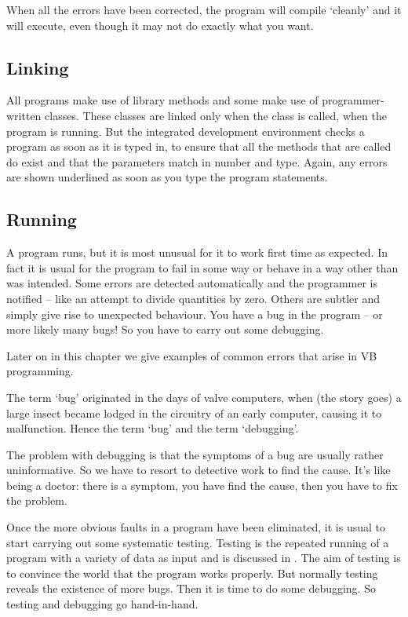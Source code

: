 			When all the errors have been corrected, the program will compile ‘cleanly’ and it will execute, even though it may not do exactly what you want.


		\subsection*{Linking}
			All programs make use of library methods and some make use of programmer-written classes. These classes are linked only when the class is called, when the program is running. But the integrated development environment checks a program as soon as it is typed in, to ensure that all the methods that are called do exist and that the parameters match in number and type. Again, any errors are shown underlined as soon as you type the program statements.


		\subsection*{Running}
			A program runs, but it is most unusual for it to work first time as expected. In fact it is usual for the program to fail in some way or behave in a way other than was intended. Some errors are detected automatically and the programmer is notified – like an attempt to divide  quantities by zero. Others are subtler and simply give rise to unexpected behaviour. You have a bug in the program – or more likely many bugs! So you have to carry out some debugging.
			
			Later on in this chapter we give examples of common errors that arise in VB programming.
			
			The term ‘bug’ originated in the days of valve computers, when (the story goes) a large insect became lodged in the circuitry of an early computer, causing it to malfunction. Hence the term ‘bug’ and the term ‘debugging’.

			The problem with debugging is that the symptoms of a bug are usually rather uninformative. So we have to resort to detective work to find the cause. It’s like being a doctor: there is a symptom, you have find the cause, then you have to fix the problem.
			
			Once the more obvious faults in a program have been eliminated, it is usual to start carrying out some systematic testing. Testing is the repeated running of a program with a variety of data as input and is discussed in . The aim of testing is to convince the world that the program works properly. But normally testing reveals the existence of more bugs. Then it is time to do some debugging. So testing and debugging go hand-in-hand.
			
